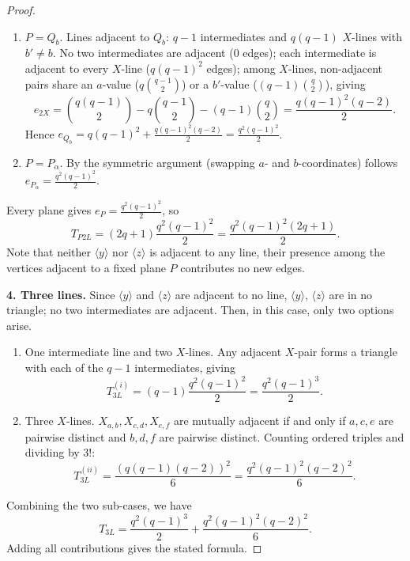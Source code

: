 \documentclass[10pt,a4paper]{amsart}
\begin{document}
\begin{proof}
\begin{enumerate}
\smallskip

\item[(ii)] $P= Q_b$. Lines adjacent to $Q_{b}$: $q-1$ intermediates and $q(q-1)$ $X$-lines with $b'\neq b$.  No two intermediates are adjacent ($0$ edges); each intermediate is adjacent to every $X$-line ($q(q-1)^2$ edges); among $X$-lines, non-adjacent pairs share an $a$-value ($q\binom{q-1}{2}$) or a $b'$-value ($(q-1)\binom{q}{2}$), giving
\begin{equation}\label{e2X-B2}
e_{2X} =\binom{q(q-1)}{2}-q\binom{q-1}{2}-(q-1)\binom{q}{2} =\frac{q(q-1)^2(q-2)}{2}.
\end{equation}
Hence $e_{Q_{b}}=q(q-1)^2+\frac{q(q-1)^2(q-2)}{2}=\frac{q^2(q-1)^2}{2}$.

\smallskip

\item[(iii)] $P= P_{\alpha}$. By the symmetric argument (swapping $a$- and $b$-coordinates) follows $e_{P_{\alpha}} =\frac{q^2(q-1)^2}{2}$.
\end{enumerate}
Every plane gives $e_{P}=\frac{q^2(q-1)^2}{2}$, so
\[T_{P2L}=(2q+1) \frac{q^2(q-1)^2}{2} =\frac{q^2(q-1)^2(2q+1)}{2}.\]
Note that neither $\langle y\rangle$ nor $\langle z \rangle$ is adjacent to any line, their presence
among the vertices adjacent to a fixed plane $P$ contributes no new edges. 

\smallskip
\noindent\textbf{4. Three lines.} Since $\langle y \rangle$ and $\langle z
\rangle$ are adjacent to no line, $\langle y\rangle$, $\langle z\rangle$ are in no triangle; no two intermediates are adjacent. Then, in this case, only two options arise.
\begin{enumerate}
\item[(i)] One intermediate line and two $X$-lines. Any adjacent $X$-pair forms a triangle with each of the $q-1$ intermediates, giving
\[T_{3L}^{(i)} = (q-1) \frac{q^2(q-1)^2}{2}=\frac{q^2(q-1)^3}{2}.\]

\item[(ii)] Three $X$-lines. $X_{a,b},X_{c,d},X_{e,f}$ are mutually adjacent if and only if $a,c,e$ are pairwise distinct and $b,d,f$ are pairwise distinct.  Counting ordered triples and dividing by $3!$: 
\[T_{3L}^{(ii)} =\frac{(q(q-1)(q-2))^2}{6}=\frac{q^2(q-1)^2(q-2)^2}{6}.\]
\end{enumerate}
Combining the two sub-cases, we have
\[T_{3L}=\frac{q^2(q-1)^3}{2}+\frac{q^2(q-1)^2(q-2)^2}{6}.\]
Adding all contributions gives the stated formula.
\end{proof}
\end{document}
